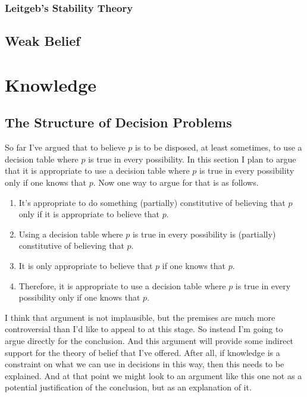 \documentclass[11pt,]{book}
\providecommand{\tightlist}{%
  \setlength{\itemsep}{0pt}\setlength{\parskip}{0pt}}
\begin{document}
\hypertarget{leitgeb}{%
\subsection{Leitgeb's Stability Theory}\label{leitgeb}}

\hypertarget{weak-belief}{%
\section{Weak Belief}\label{weak-belief}}

\hypertarget{knowledge}{%
\chapter{Knowledge}\label{knowledge}}

\hypertarget{structure}{%
\section{The Structure of Decision Problems}\label{structure}}

So far I've argued that to believe \(p\) is to be disposed, at least sometimes, to use a decision table where \(p\) is true in every possibility. In this section I plan to argue that it is appropriate to use a decision table where \(p\) is true in every possibility only if one knows that \(p\). Now one way to argue for that is as follows.

\begin{enumerate}
\def\labelenumi{\arabic{enumi}.}
\tightlist
\item
  It's appropriate to do something (partially) constitutive of believing that \(p\) only if it is appropriate to believe that \(p\).
\item
  Using a decision table where \(p\) is true in every possibility is (partially) constitutive of believing that \(p\).
\item
  It is only appropriate to believe that \(p\) if one knows that \(p\).
\item
  Therefore, it is appropriate to use a decision table where \(p\) is true in every possibility only if one knows that \(p\).
\end{enumerate}

I think that argument is not implausible, but the premises are much more controversial than I'd like to appeal to at this stage. So instead I'm going to argue directly for the conclusion. And this argument will provide some indirect support for the theory of belief that I've offered. After all, if knowledge is a constraint on what we can use in decisions in this way, then this needs to be explained. And at that point we might look to an argument like this one not as a potential justification of the conclusion, but as an explanation of it.
\end{document}
